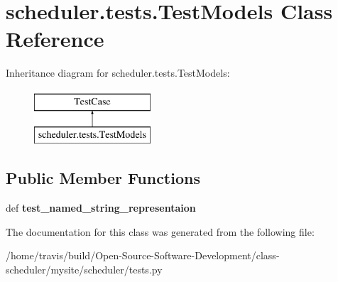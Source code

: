 \hypertarget{classscheduler_1_1tests_1_1_test_models}{\section{scheduler.\-tests.\-Test\-Models Class Reference}
\label{classscheduler_1_1tests_1_1_test_models}
}
Inheritance diagram for scheduler.\-tests.\-Test\-Models\-:\begin{figure}[H]
\begin{center}
\leavevmode
\includegraphics[height=2.000000cm]{classscheduler_1_1tests_1_1_test_models}
\end{center}
\end{figure}
\subsection*{Public Member Functions}
\begin{DoxyCompactItemize}
\item 
\hypertarget{classscheduler_1_1tests_1_1_test_models_af510ca5763450833e880baaf9ed65924}{def {\bfseries test\-\_\-named\-\_\-string\-\_\-representaion}}\label{classscheduler_1_1tests_1_1_test_models_af510ca5763450833e880baaf9ed65924}

\end{DoxyCompactItemize}


The documentation for this class was generated from the following file\-:\begin{DoxyCompactItemize}
\item 
/home/travis/build/\-Open-\/\-Source-\/\-Software-\/\-Development/class-\/scheduler/mysite/scheduler/tests.\-py\end{DoxyCompactItemize}
